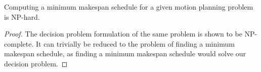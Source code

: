 \begin{corollary}
	Computing a minimum makespan schedule for a given motion planning problem is NP-hard.
\end{corollary}

\begin{proof}
	The decision problem formulation of the same problem is shown to be NP-complete. It can trivially be reduced to the problem of finding a minimum makespan schedule, as finding a minimum makespan schedule would solve our decision problem. 
\end{proof}
